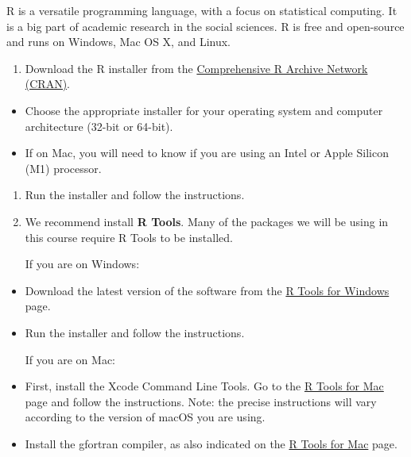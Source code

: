 \documentclass[
  letterpaper,
  DIV=11,
  numbers=noendperiod]{scrartcl}
\providecommand{\tightlist}{%
  \setlength{\itemsep}{0pt}\setlength{\parskip}{0pt}}\usepackage{longtable,booktabs,array}
\begin{document}
\begin{tcolorbox}[enhanced jigsaw, colback=white, coltitle=black, toprule=.15mm, opacitybacktitle=0.6, title=\textcolor{quarto-callout-tip-color}{\faLightbulb}\hspace{0.5em}{R install details}, bottomrule=.15mm, toptitle=1mm, breakable, bottomtitle=1mm, colbacktitle=quarto-callout-tip-color!10!white, opacityback=0, colframe=quarto-callout-tip-color-frame, arc=.35mm, titlerule=0mm, rightrule=.15mm, leftrule=.75mm, left=2mm]

R is a versatile programming language, with a focus on statistical
computing. It is a big part of academic research in the social sciences.
R is free and open-source and runs on Windows, Mac OS X, and Linux.

\begin{enumerate}
\def\labelenumi{\arabic{enumi}.}
\tightlist
\item
  Download the R installer from the
  \href{https://cran.r-project.org/}{Comprehensive R Archive Network
  (CRAN)}.
\end{enumerate}

\begin{itemize}
\tightlist
\item
  Choose the appropriate installer for your operating system and
  computer architecture (32-bit or 64-bit).
\item
  If on Mac, you will need to know if you are using an Intel or Apple
  Silicon (M1) processor.
\end{itemize}

\begin{enumerate}
\def\labelenumi{\arabic{enumi}.}
\setcounter{enumi}{1}
\item
  Run the installer and follow the instructions.
\item
  We recommend install \textbf{R Tools}. Many of the packages we will be
  using in this course require R Tools to be installed.

  If you are on Windows:
\end{enumerate}

\begin{itemize}
\item
  Download the latest version of the software from the
  \href{https://cran.r-project.org/bin/windows/Rtools/}{R Tools for
  Windows} page.
\item
  Run the installer and follow the instructions.

  If you are on Mac:
\item
  First, install the Xcode Command Line Tools. Go to the
  \href{https://mac.r-project.org/tools/}{R Tools for Mac} page and
  follow the instructions. Note: the precise instructions will vary
  according to the version of macOS you are using.
\item
  Install the gfortran compiler, as also indicated on the
  \href{https://mac.r-project.org/tools/}{R Tools for Mac} page.
\end{itemize}

\end{tcolorbox}
\end{document}
